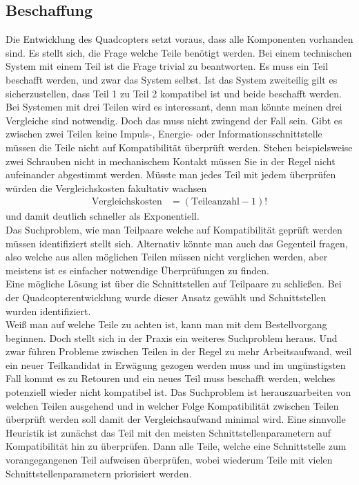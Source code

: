 \subsection{\label{Beschaffung}Beschaffung}
Die Entwicklung des Quadcopters setzt voraus, dass alle Komponenten vorhanden sind. Es stellt sich, die Frage welche Teile benötigt werden. Bei einem technischen System mit einem Teil ist die Frage trivial zu beantworten. Es muss ein Teil beschafft werden, und zwar das System selbst. Ist das System zweiteilig gilt es sicherzustellen, dass Teil 1 zu Teil 2 kompatibel ist und beide beschafft werden. Bei Systemen mit drei Teilen wird es interessant, denn man könnte meinen drei Vergleiche sind notwendig. Doch das muss nicht zwingend der Fall sein. Gibt es zwischen zwei Teilen keine Impuls-, Energie- oder Informationsschnittstelle müssen die Teile nicht auf Kompatibilität überprüft werden. Stehen beispielsweise zwei Schrauben nicht in mechanischem Kontakt müssen Sie in der Regel nicht aufeinander abgestimmt werden. Müsste man jedes Teil mit jedem überprüfen würden die Vergleichskosten fakultativ wachsen
\begin{align}
	\text{Vergleichskosten} &= (\text{Teileanzahl} - 1)!
\end{align}
und damit deutlich schneller als Exponentiell.\\
Das Suchproblem, wie man Teilpaare welche auf Kompatibilität geprüft werden müssen identifiziert stellt sich. Alternativ könnte man auch das Gegenteil fragen, also welche aus allen möglichen Teilen müssen nicht verglichen werden, aber meistens ist es einfacher notwendige Überprüfungen zu finden.\\
Eine mögliche Lösung ist über die Schnittstellen auf Teilpaare zu schließen. Bei der Quadcopterentwicklung wurde dieser Ansatz gewählt und Schnittstellen wurden identifiziert.\\
Weiß man auf welche Teile zu achten ist, kann man mit dem Bestellvorgang beginnen. Doch stellt sich in der Praxis ein weiteres Suchproblem heraus. Und zwar führen Probleme zwischen Teilen in der Regel zu mehr Arbeitsaufwand, weil ein neuer Teilkandidat in Erwägung gezogen werden muss und im ungünstigsten Fall kommt es zu Retouren und ein neues Teil muss beschafft werden, welches potenziell wieder nicht kompatibel ist. Das Suchproblem ist herauszuarbeiten von welchen Teilen ausgehend und in welcher Folge Kompatibilität zwischen Teilen überprüft werden soll damit der Vergleichsaufwand minimal wird. Eine sinnvolle Heuristik ist zunächst das Teil mit den meisten Schnittstellenparametern auf Kompatibilität hin zu überprüfen. Dann alle Teile, welche eine Schnittstelle zum vorangegangenen Teil aufweisen überprüfen, wobei wiederum Teile mit vielen Schnittstellenparametern priorisiert werden.\\
